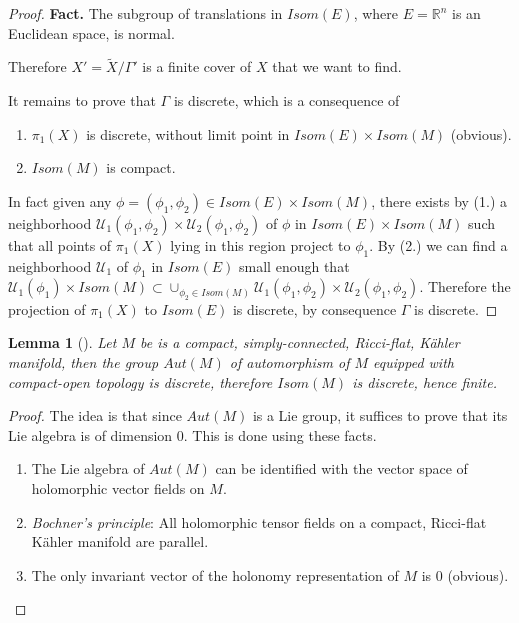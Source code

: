 \documentclass[11pt]{article}
\newtheorem{lemma}[theorem]{Lemma}
\begin{document}
\begin{proof}
\textbf{Fact.} The subgroup of translations in \(Isom(E)\), where \(E = \mathbb{R}^n\) is an Euclidean space, is
normal.

Therefore \(X' = \tilde X/\Gamma'\) is a finite cover of \(X\) that we want to find.

It remains to prove that \(\Gamma\) is discrete, which is a consequence of
\begin{enumerate}
\item \(\pi_1(X)\) is discrete, without limit point in \(Isom(E)\times Isom(M)\) (obvious).
\item \(Isom(M)\) is compact.
\end{enumerate}
In fact given any \(\phi = (\phi_1,\phi_2) \in Isom(E)\times Isom(M)\), there exists by (1.) a neighborhood \(\mathcal{U}_1(\phi_1,\phi_2)\times \mathcal{U}_2(\phi_1,\phi_2)\) of \(\phi\) in \(Isom(E)\times
Isom(M)\) such that all points of \(\pi_1(X)\) lying in this region project to \(\phi_1\). By (2.)
we can find a neighborhood \(\mathcal{U}_1\) of \(\phi_1\) in \(Isom(E)\) small enough that \(\mathcal{U}_1(\phi_1)\times Isom(M) \subset \cup_{\phi_2\in Isom(M)}
\mathcal{U}_1(\phi_1,\phi_2)\times \mathcal{U}_2(\phi_1,\phi_2)\). Therefore the projection of
\(\pi_1(X)\) to \(Isom(E)\) is discrete, by consequence \(\Gamma\) is discrete.
\end{proof}

\begin{lemma}[]
\label{lem:Isom-discrete}
\label{org65d013f}
Let \(M\) be is a compact, simply-connected, Ricci-flat, Kähler manifold, then the group \(Aut(M)\) of
automorphism of \(M\) equipped with compact-open topology is discrete, therefore \(Isom(M)\) is discrete,
hence finite. 
\end{lemma}
\begin{proof}
The idea is that since \(Aut(M)\) is a Lie group, it suffices to prove that its Lie algebra is of
dimension 0. This is done using these facts. 
\begin{enumerate}
\item The Lie algebra of \(Aut(M)\) can be identified with the vector space of holomorphic vector
fields on \(M\).
\item \emph{Bochner's principle}: All holomorphic tensor fields on a compact, Ricci-flat Kähler manifold are
parallel.
\item The only invariant vector of the holonomy representation of \(M\) is \(0\) (obvious).
\end{enumerate}
\end{proof}
\end{document}
